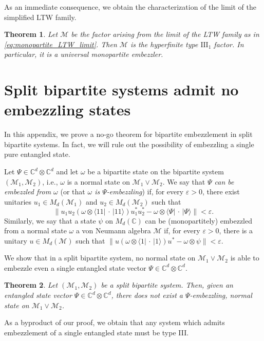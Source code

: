 \documentclass[a4paper, 10pt, onecolumn, accepted=2025-07-22]{quantumarticle}
\newtheorem{theorem}{Theorem}
\theoremstyle{definition}
\newcommand{\ket}[1]{|#1\rangle}
\newcommand{\bra}[1]{\langle#1|}
\newcommand{\norm}[1]{\lVert #1\rVert}
\newcommand{\ox}{\otimes}
\newcommand{\mc}{\mathcal}
\newcommand{\eps}{\varepsilon}
\newcommand{\III}{{\mathrm{III}}}
\def\CC{{\mathbb C}}
\def\M{{\mc M}}
\newcommand*{\1}{\text{\usefont{U}{bbold}{m}{n}1}}
\newcommand{\placeholder}[0]{{\,\cdot\,}}
\begin{document}
As an immediate consequence, we obtain the characterization of the limit of the simplified LTW family.

\begin{theorem}\label{thm:ltw_type}
    Let $\M$ be the factor arising from the limit of the LTW family as in \eqref{eq:monopartite_LTW_limit}.
    Then $\M$ is the hyperfinite type $\III_1$ factor. In particular, it is a universal monopartite embezzler.
\end{theorem}


\appendix

\section{Split bipartite systems admit no embezzling states}

In this appendix, we prove a no-go theorem for bipartite embezzlement in split bipartite systems.
In fact, we will rule out the possibility of embezzling a single pure entangled state.

Let $\Psi\in\CC^d\ox\CC^d$ and let $\omega$ be a bipartite state on the bipartite system $(\M_1,\M_2)$, i.e., $\omega$ is a normal state on $\M_1\vee\M_2$.
We say that \emph{$\Psi$ can be embezzled from $\omega$} (or that \emph{$\omega$ is $\Psi$-embezzling}) if, for every $\eps>0$, there exist unitaries $u_1\in M_d(\M_1)$ and $u_2\in M_d(\M_2)$ such that
\begin{equation}
    \norm{u_1u_2 (\omega\ox \bra{11}\placeholder\ket{11})u_1^*u_2^*-\omega \ox \bra\Psi\placeholder\ket\Psi}<\eps.
\end{equation}
Similarly, we say that a state $\psi$ on $M_d(\CC)$ can be (monopartitely) embezzled from a normal state $\omega$ a von Neumann algebra $\M$ if, for every $\eps>0$, there is a unitary $u\in M_d(\M)$ such that $\norm{u(\omega\ox\bra1\placeholder\ket1)u^*-\omega\ox\psi}<\eps$.

We show that in a split bipartite system, no normal state on $\M_1\vee\M_2$ is able to embezzle even a single entangled state vector $\Psi\in\CC^d\ox\CC^d$.

\begin{theorem}\label{thm:no-go}
    Let $(\M_1,\M_2)$ be a split bipartite system. Then, given an entangled state vector $\Psi\in\CC^d\ox\CC^d$, there does not exist a $\Psi$-embezzling, normal state on $\M_1\vee\M_2$.
\end{theorem}

As a byproduct of our proof, we obtain that any system which admits embezzlement of a single entangled state must be type III.
\end{document}
